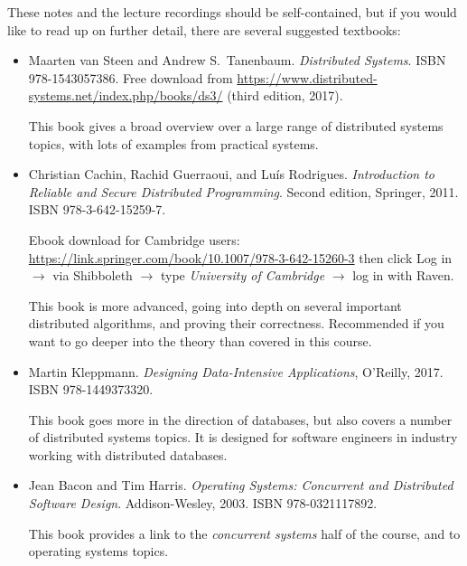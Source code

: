 These notes and the lecture recordings should be self-contained, but if you would like to read up on further detail, there are several suggested textbooks:
\begin{itemize}
    \item Maarten van Steen and Andrew S.\ Tanenbaum. \emph{Distributed Systems}. ISBN 978-1543057386.
        Free download from \url{https://www.distributed-systems.net/index.php/books/ds3/} (third edition, 2017).

        This book gives a broad overview over a large range of distributed systems topics, with lots of examples from practical systems.

    \item Christian Cachin, Rachid Guerraoui, and Luís Rodrigues.
        \emph{Introduction to Reliable and Secure Distributed Programming}.
        Second edition, Springer, 2011. ISBN 978-3-642-15259-7.

        Ebook download for Cambridge users: \url{https://link.springer.com/book/10.1007/978-3-642-15260-3} then click Log in $\rightarrow$ via Shibboleth $\rightarrow$ type \emph{University of Cambridge} $\rightarrow$ log in with Raven.

        This book is more advanced, going into depth on several important distributed algorithms, and proving their correctness.
        Recommended if you want to go deeper into the theory than covered in this course.

    \item Martin Kleppmann. \emph{Designing Data-Intensive Applications}, O'Reilly, 2017. ISBN 978-1449373320.

        This book goes more in the direction of databases, but also covers a number of distributed systems topics.
        It is designed for software engineers in industry working with distributed databases.

    \item Jean Bacon and Tim Harris. \emph{Operating Systems: Concurrent and Distributed Software Design}.
        Addison-Wesley, 2003. ISBN 978-0321117892.

        This book provides a link to the \emph{concurrent systems} half of the course, and to operating systems topics.
\end{itemize}

